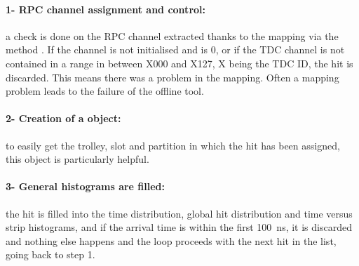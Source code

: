 	\paragraph{1- RPC channel assignment and control:} a check is done on the RPC channel extracted thanks to the mapping via the method . If the channel is not initialised and is 0, or if the TDC channel is not contained in a range in between X000 and X127, X being the TDC ID, the hit is discarded. This means there was a problem in the mapping. Often a mapping problem leads to the failure of the offline tool.
	
	\paragraph{2- Creation of a  object:} to easily get the trolley, slot and partition in which the hit has been assigned, this object is particularly helpful.
	
	\paragraph{3- General histograms are filled:} the hit is filled into the time distribution, global hit distribution and time versus strip histograms, and if the arrival time is within the first \SI{100}{ns}, it is discarded and nothing else happens and the loop proceeds with the next hit in the list, going back to step 1.\\
	
